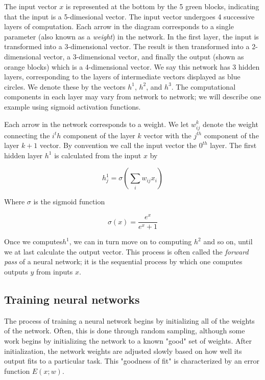 The input vector $x$ is represented at the bottom by the 5 green blocks, indicating that the input is a 5-dimesional vector. The input vector undergoes 4 successive layers of computation. Each arrow in the diagram corresponds to a single parameter (also known as a {\em weight}) in the network. In the first layer, the input is transformed into a 3-dimensional vector. The result is then transformed into a 2-dimensional vector, a 3-dimensional vector, and finally the output (shown as orange blocks) which is a 4-dimensional vector. We say this network has 3 hidden layers, corresponding to the layers of intermediate vectors displayed as blue circles. We denote these by the vectors $h^1$, $h^2$, and $h^3$. The computational components in each layer may vary from network to network; we will describe one example using sigmoid activation functions.

Each arrow in the network corresponds to a weight. We let $w_{ij}^k$ denote the weight connecting the $i^th$ component of the layer $k$ vector with the $j^{th}$ component of the layer $k+1$ vector. By convention we call the input vector the $0^{th}$ layer. The first hidden layer $h^1$ is calculated from the input $x$ by

\begin{equation}
    h^1_j = \sigma \left( \sum_{i} w_{ij}x_i \right)
\label{eq:layer}
\end{equation}

Where $\sigma$ is the sigmoid function

$$
\sigma(x) = \dfrac{e^x}{e^x+1}
$$

Once we computes$h^1$, we can in turn move on to computing $h^2$ and so on, until we at last calculate the output vector. This process is often called the {\em forward pass} of a neural network; it is the sequential process by which one computes outputs $y$ from inputs $x$. 

\subsection{Training neural networks}

The process of training a neural network begins by initializing all of the weights of the network. Often, this is done through random sampling, although some work begins by initializing the network to a known "good" set of weights. After initialization, the network weights are adjusted slowly based on how well its output fits to a particular task. This "goodness of fit" is characterized by an error function $E(x;w)$. 

